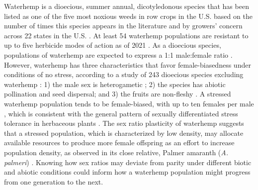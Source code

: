 \documentclass[
]{article}
\begin{document}
Waterhemp is a dioecious, summer annual, dicotyledonous species that has been listed as one of the five most noxious weeds in row crops in the U.S. based on the number of times this species appears in the literature \citep{johnsonInfluenceGlyphosateresistantCropping2009} and by growers' concern across 22 states in the U.S. \citep{princeBenchmarkStudyIV2012}. At least 54 waterhemp populations are resistant to up to five herbicide modes of action as of 2021 \citep{heapHerbicideResistantTall2021}. As a dioecious species, populations of waterhemp are expected to express a 1:1 male:female ratio \citep{grantCytogeneticStudiesAmaranthus1959, costeaBiologyInvasiveAlien2005, heneghanGrowthDevelopmentFive2017}. However, waterhemp has three characteristics that favor female-biasedness under conditions of no stress, according to a study of 243 dioecious species excluding waterhemp \citep{fieldComparativeAnalysesSexratio2013}: 1) the male sex is heterogametic \citep{montgomeryMaleSpecificChromosomal2021}; 2) the species has abiotic pollination and seed dispersal; and 3) the fruits are non-fleshy \citep{costeaBiologyInvasiveAlien2005}. A stressed waterhemp population tends to be female-biased, with up to ten females per male \citep{prattAmaranthusRudisTuberculatus2001}, which is consistent with the general pattern of sexually differentiated stress tolerance in herbaceous plants \citep[38 species, excluding waterhemp,][]{juvanySexrelatedDifferencesStress2015}. The sex ratio plasticity of waterhemp suggests that a stressed population, which is characterized by low density, may allocate available resources to produce more female offspring as an effort to increase population density, as observed in its close relative, Palmer amaranth (\emph{A. palmeri}) \citep{korresPalmerAmaranthAmaranthus2017, mesgaranSexLabilityDimorphism2019}. Knowing how sex ratios may deviate from parity under different biotic and abiotic conditions could inform how a waterhemp population might progress from one generation to the next.
\end{document}
